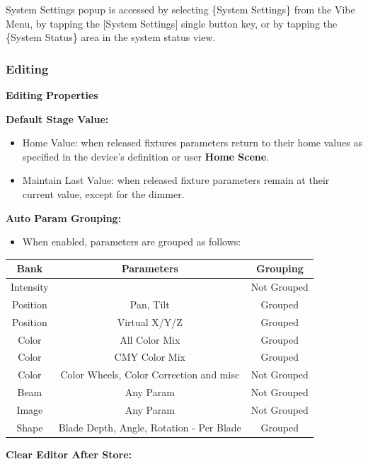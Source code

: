 \documentclass[
]{article}
\providecommand{\tightlist}{%
  \setlength{\itemsep}{0pt}\setlength{\parskip}{0pt}}
\begin{document}
System Settings popup is accessed by selecting \{System Settings\} from the Vibe Menu, by tapping the {[}System Settings{]} single button key, or by tapping the \{System Status\} area in the system status view.

\hypertarget{editing}{%
\subsubsection{Editing}\label{editing}}

\textbf{Editing Properties}

\textbf{Default Stage Value:}

\begin{itemize}
\item
  Home Value: when released fixtures parameters return to their home values as specified in the device's definition or user \textbf{Home Scene}.
\item
  Maintain Last Value: when released fixture parameters remain at their current value, except for the dimmer.
\end{itemize}

\textbf{Auto Param Grouping:}

\begin{itemize}
\tightlist
\item
  When enabled, parameters are grouped as follows:
\end{itemize}

\begin{longtable}[]{@{}ccc@{}}
\toprule\noalign{}
\textbf{Bank} & \textbf{Parameters} & \textbf{Grouping} \\
\midrule\noalign{}
\endhead
\bottomrule\noalign{}
\endlastfoot
Intensity & & Not Grouped \\
Position & Pan, Tilt & Grouped \\
Position & Virtual X/Y/Z & Grouped \\
Color & All Color Mix & Grouped \\
Color & CMY Color Mix & Grouped \\
Color & Color Wheels, Color Correction and misc & Not Grouped \\
Beam & Any Param & Not Grouped \\
Image & Any Param & Not Grouped \\
Shape & Blade Depth, Angle, Rotation - Per Blade & Grouped \\
\end{longtable}

\textbf{Clear Editor After Store:}
\end{document}
